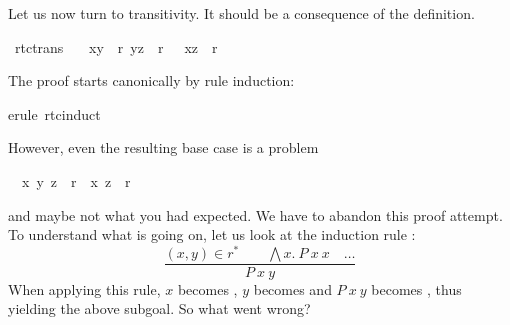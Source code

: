 \begin{isabellebody}
\begin{isamarkuptext}
Let us now turn to transitivity. It should be a consequence of the definition.%
\end{isamarkuptext}%
\ rtc{\isacharunderscore}trans{\isacharcolon}\isanewline
\ \ {\isachardoublequote}{\isasymlbrakk}\ {\isacharparenleft}x{\isacharcomma}y{\isacharparenright}\ {\isasymin}\ r{\isacharasterisk}{\isacharsemicolon}\ {\isacharparenleft}y{\isacharcomma}z{\isacharparenright}\ {\isasymin}\ r{\isacharasterisk}\ {\isasymrbrakk}\ {\isasymLongrightarrow}\ {\isacharparenleft}x{\isacharcomma}z{\isacharparenright}\ {\isasymin}\ r{\isacharasterisk}{\isachardoublequote}%
\begin{isamarkuptxt}%
\noindent
The proof starts canonically by rule induction:%
\end{isamarkuptxt}%
erule\ rtc{\isachardot}induct{\isacharparenright}%
\begin{isamarkuptext}%
\noindent
However, even the resulting base case is a problem
\begin{isabelle}
\ {}{\isachardot}\ {\isasymAnd}x{\isachardot}\ {\isacharparenleft}y{\isacharcomma}\ z{\isacharparenright}\ {\isasymin}\ r{\isacharasterisk}\ {\isasymLongrightarrow}\ {\isacharparenleft}x{\isacharcomma}\ z{\isacharparenright}\ {\isasymin}\ r{\isacharasterisk}
\end{isabelle}
and maybe not what you had expected. We have to abandon this proof attempt.
To understand what is going on,
let us look at the induction rule :
\[ \frac{(x,y) \in r^* \qquad \bigwedge x.~P~x~x \quad \dots}{P~x~y} \]
When applying this rule, $x$ becomes , $y$ becomes
 and $P~x~y$ becomes , thus
yielding the above subgoal. So what went wrong?


\end{isamarkuptext}
\end{isabellebody}
